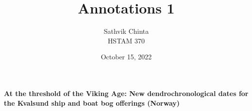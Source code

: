 \documentclass[a4paper]{article}
\title {
	Annotations 1
}
\author {
	\normalsize Sathvik Chinta\\\normalsize
    \normalsize HSTAM 370\\\normalsize
}
\date {
	\color{black} October 15, 2022
}
\begin{document}
 \maketitle
    \section{}
        \textbf{At the threshold of the Viking Age: New dendrochronological dates for the Kvalsund ship and boat bog offerings (Norway)}

        \pagebreak
        
        
\end{document}
